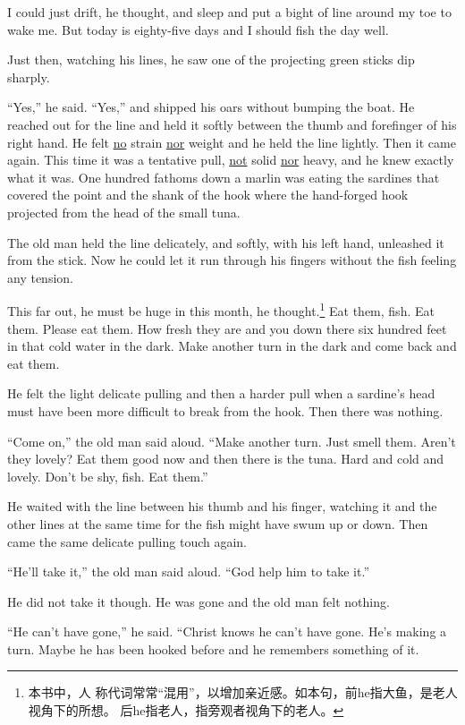 I could just drift, he thought, and sleep and put a \gls{bight} of line
around my \gls{toe} to wake me. But today is eighty-five days and I should
fish the day well.

Just then, watching his lines, he saw one of the projecting green
sticks dip sharply.

``Yes,'' he said. ``Yes,'' and shipped his oars without \gls{bumping} the
boat. He reached out for the line and held it softly between the \gls{thumb}
and \gls{forefinger} of his right hand. He felt \uline{no} \gls{strain}
\uline{nor} weight and he held the line lightly. Then it came again. This
time it was a \gls{tentative} pull, \uline{not} \gls{solid} \uline{nor}
heavy, and he knew exactly what it was. One hundred fathoms down a marlin
was eating the sardines that covered the point and the shank of the hook
where the hand-\gls{forged} hook projected from the head of the small tuna.

The old man held the line delicately, and softly, with his left hand,
\gls{unleashed} it from the stick. Now he could let it run through his
fingers without the fish feeling any \gls{tension}.

This far out, he must be huge in this month, he thought.\footnote{本书中，人
  称代词常常“混用”，以增加亲近感。如本句，前he指大鱼，是老人视角下的所想。
  后he指老人，指旁观者视角下的老人。} Eat them, fish. Eat them. Please eat
them. How fresh they are and you down there six hundred feet in that cold
water in the dark. Make another turn in the dark and come back and eat them.

He felt the light delicate pulling and then a harder pull when a sardine's
head must have been more difficult to break from the hook. Then there was
nothing.

``Come on,'' the old man said aloud. ``Make another turn. Just smell them.
Aren't they lovely? Eat them good now and then there is the tuna. Hard and
cold and lovely. Don't be shy, fish. Eat them.''

He waited with the line between his thumb and his finger, watching it and
the other lines at the same time for the fish might have swum up or down.
Then came the same delicate pulling touch again.

``He'll take it,'' the old man said aloud. ``God help him to take it.''

He did not take it though. He was gone and the old man felt nothing.

``He can't have gone,'' he said. ``\gls{Christ} knows he can't have gone. He's
making a turn. Maybe he has been hooked before and he remembers something of
it.

